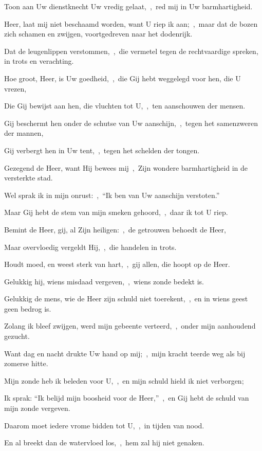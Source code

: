 \documentclass[12pt,twoside,a5paper]{article}
\begin{document}
\begin{halfparskip}
  Toon aan Uw dienstknecht Uw vredig gelaat,~\sep\ red mij in Uw barmhartigheid.

  Heer, laat mij niet beschaamd worden, want U riep ik aan;~\sep\ maar dat de bozen zich schamen en zwijgen, voortgedreven naar het dodenrijk.

  Dat de leugenlippen verstommen,~\sep\ die vermetel tegen de rechtvaardige spreken, in trots en verachting.

  Hoe groot, Heer, is Uw goedheid,~\sep\ die Gij hebt weggelegd voor hen, die U vrezen,

  Die Gij bewijst aan hen, die vluchten tot U,~\sep\ ten aanschouwen der mensen.

  Gij beschermt hen onder de schutse van Uw aanschijn,~\sep\ tegen het samenzweren der mannen,

  Gij verbergt hen in Uw tent,~\sep\ tegen het schelden der tongen.

  Gezegend de Heer, want Hij bewees mij~\sep\ Zijn wondere barmhartigheid in de versterkte stad.

  Wel sprak ik in mijn onrust:~\sep\ ``Ik ben van Uw aanschijn verstoten.''

  Maar Gij hebt de stem van mijn smeken gehoord,~\sep\ daar ik tot U riep.

  Bemint de Heer, gij, al Zijn heiligen:~\sep\ de getrouwen behoedt de Heer,

  Maar overvloedig vergeldt Hij,~\sep\ die handelen in trots.

  Houdt moed, en weest sterk van hart,~\sep\ gij allen, die hoopt op de Heer.

   Gelukkig hij, wiens misdaad vergeven,~\sep\ wiens zonde bedekt is.

  Gelukkig de mens, wie de Heer zijn schuld niet toerekent,~\sep\ en in wiens geest geen bedrog is.

  Zolang ik bleef zwijgen, werd mijn gebeente verteerd,~\sep\ onder mijn aanhoudend gezucht.

  Want dag en nacht drukte Uw hand op mij;~\sep\ mijn kracht teerde weg als bij zomerse hitte.

  Mijn zonde heb ik beleden voor U,~\sep\ en mijn schuld hield ik niet verborgen;

  Ik sprak: ``Ik belijd mijn boosheid voor de Heer,''~\sep\ en Gij hebt de schuld van mijn zonde vergeven.

  Daarom moet iedere vrome bidden tot U,~\sep\ in tijden van nood.

  En al breekt dan de watervloed los,~\sep\ hem zal hij niet genaken.


\end{halfparskip}
\end{document}
